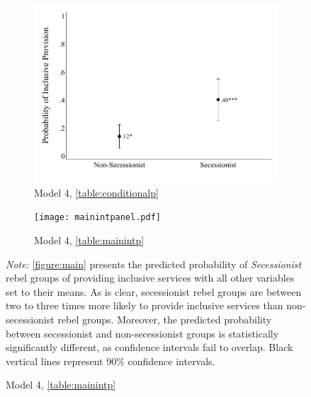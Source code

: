 \documentclass[12pt, letterpaper]{article}
\begin{document}
\begin{figure}[h]
\renewcommand\thefigure{A.\arabic{figure}}
\caption{\textbf{Predicted Effect of Secessionism on Inclusive Services (Panel)}}
\label{figure:mainpanel}
\centering
	\begin{subfigure}{0.45\textwidth}
    \centering
    \caption{Model 4, \autoref{table:conditionalp}} \label{figure:mainpanelcond}
    \includegraphics[width=\textwidth]{mainpanel.pdf}
    \end{subfigure}
% 
	\begin{subfigure}{0.45\textwidth}
    \centering
    \caption{Model 4, \autoref{table:mainintp}} \label{figure:mainpanelint}
    \texttt{[image: mainintpanel.pdf]}
    \end{subfigure}
  \begin{tablenotes}
\raggedright \footnotesize{\textit{Note:} \autoref{figure:main} presents the predicted probability of \textit{Secessionist} rebel groups of providing inclusive services with all other variables set to their means. As is clear, secessionist rebel groups are between two to three times more likely to provide inclusive services than non-secessionist rebel groups. Moreover, the predicted probability between secessionist and non-secessionist groups is statistically significantly different, as confidence intervals fail to overlap. Black vertical lines represent 90\% confidence intervals.}
\end{tablenotes}
\end{figure}
\end{document}
